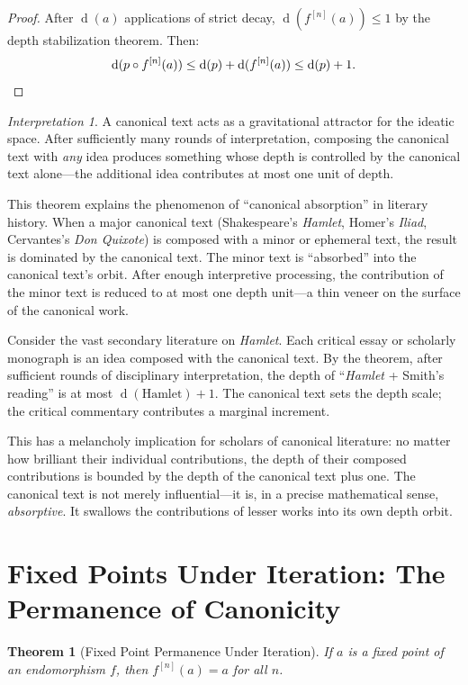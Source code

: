 \documentclass[11pt,openany]{book}
\theoremstyle{definition}
\theoremstyle{plain}
\newtheorem{theorem}[axiom]{Theorem}
\theoremstyle{remark}
\newtheorem{interpretation}[axiom]{Interpretation}
\newcommand{\compose}{\circ}                 %
\newcommand{\depth}{\operatorname{d}}       %
\begin{document}
\begin{proof}
After $\depth(a)$ applications of strict decay, $\depth(f^{[n]}(a)) \leq 1$ by the depth stabilization theorem. Then:
\[
\depth(p \compose f^{[n]}(a)) \leq \depth(p) + \depth(f^{[n]}(a)) \leq \depth(p) + 1. \qedhere
\]
\end{proof}

\begin{interpretation}
A canonical text acts as a gravitational attractor for the ideatic space. After sufficiently many rounds of interpretation, composing the canonical text with \emph{any} idea produces something whose depth is controlled by the canonical text alone---the additional idea contributes at most one unit of depth.

This theorem explains the phenomenon of ``canonical absorption'' in literary history. When a major canonical text (Shakespeare's \textit{Hamlet}, Homer's \textit{Iliad}, Cervantes's \textit{Don Quixote}) is composed with a minor or ephemeral text, the result is dominated by the canonical text. The minor text is ``absorbed'' into the canonical text's orbit. After enough interpretive processing, the contribution of the minor text is reduced to at most one depth unit---a thin veneer on the surface of the canonical work.

Consider the vast secondary literature on \textit{Hamlet}. Each critical essay or scholarly monograph is an idea composed with the canonical text. By the theorem, after sufficient rounds of disciplinary interpretation, the depth of ``\textit{Hamlet} + Smith's reading'' is at most $\depth(\text{Hamlet}) + 1$. The canonical text sets the depth scale; the critical commentary contributes a marginal increment.

This has a melancholy implication for scholars of canonical literature: no matter how brilliant their individual contributions, the depth of their composed contributions is bounded by the depth of the canonical text plus one. The canonical text is not merely influential---it is, in a precise mathematical sense, \emph{absorptive}. It swallows the contributions of lesser works into its own depth orbit.
\end{interpretation}

\section{Fixed Points Under Iteration: The Permanence of Canonicity}

\begin{theorem}[Fixed Point Permanence Under Iteration]
If $a$ is a fixed point of an endomorphism $f$, then $f^{[n]}(a) = a$ for all $n$.
\end{theorem}
\end{document}
